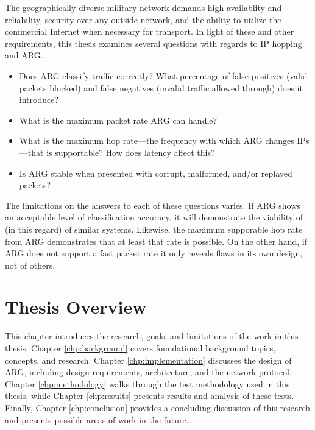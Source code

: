 \par The geographically diverse military network demands high availablity and reliability, security over any outside network, and the ability to utilize the commercial Internet when necessary for transport. In light of these and other requirements, this thesis examines several questions with regards to \ac{IP} hopping and \ac{ARG}.
\begin{itemize}
	\item Does \ac{ARG} classify traffic correctly? What percentage of false positives (valid packets blocked) and false negatives (invalid traffic allowed through) does it introduce?
	\item What is the maximum packet rate \ac{ARG} can handle?
	\item What is the maximum hop rate---the frequency with which \ac{ARG} changes \acp{IP}---that is supportable? How does latency affect this?
	\item Is \ac{ARG} stable when presented with corrupt, malformed, and/or replayed packets?
\end{itemize}

\par The limitations on the answers to each of these questions varies. If \ac{ARG} shows an acceptable level of classification accuracy, it will demonstrate the viability of (in this regard) of similar systems. Likewise, the maximum supporable hop rate from \ac{ARG} demonstrates that at least that rate is possible. On the other hand, if \ac{ARG} does not support a fast packet rate it only reveals flaws in its own design, not of others. 


\section{Thesis Overview}
\par This chapter introduces the research, goals, and limitations of the work in this thesis. Chapter \ref{chp:background} covers foundational background topics, concepts, and research. Chapter \ref{chp:implementation} discusses the design of \ac{ARG}, including design requirements, architecture, and the network protocol. Chapter \ref{chp:methodology} walks through the test methodology used in this thesis, while Chapter \ref{chp:results} presents results and analysis of these tests. Finally, Chapter \ref{chp:conclusion} provides a concluding discussion of this research and presents possible areas of work in the future.


